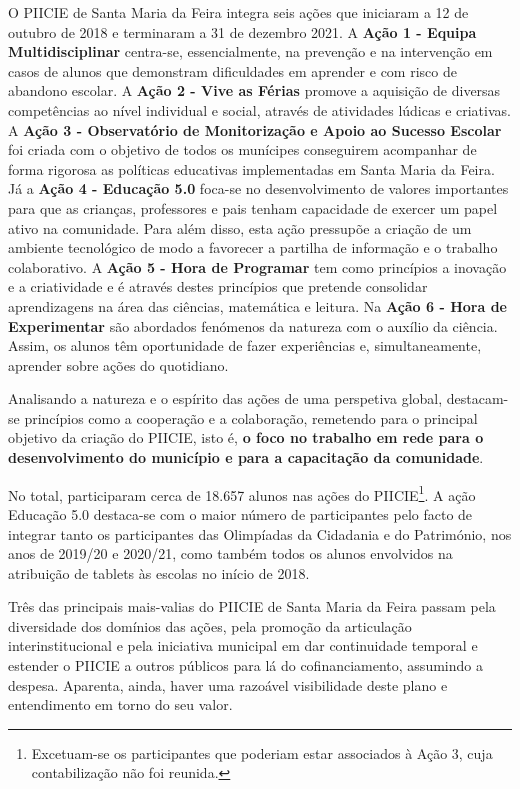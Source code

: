 \documentclass[
]{book}
\begin{document}
O PIICIE de Santa Maria da Feira integra seis ações que iniciaram a 12 de outubro de 2018 e terminaram a 31 de dezembro 2021. A \textbf{Ação 1 - Equipa Multidisciplinar} centra-se, essencialmente, na prevenção e na intervenção em casos de alunos que demonstram dificuldades em aprender e com risco de abandono escolar. A \textbf{Ação 2 - Vive as Férias} promove a aquisição de diversas competências ao nível individual e social, através de atividades lúdicas e criativas. A \textbf{Ação 3 - Observatório de Monitorização e Apoio ao Sucesso Escolar} foi criada com o objetivo de todos os munícipes conseguirem acompanhar de forma rigorosa as políticas educativas implementadas em Santa Maria da Feira. Já a \textbf{Ação 4 - Educação 5.0} foca-se no desenvolvimento de valores importantes para que as crianças, professores e pais tenham capacidade de exercer um papel ativo na comunidade. Para além disso, esta ação pressupõe a criação de um ambiente tecnológico de modo a favorecer a partilha de informação e o trabalho colaborativo. A \textbf{Ação 5 - Hora de Programar} tem como princípios a inovação e a criatividade e é através destes princípios que pretende consolidar aprendizagens na área das ciências, matemática e leitura. Na \textbf{Ação 6 - Hora de Experimentar} são abordados fenómenos da natureza com o auxílio da ciência. Assim, os alunos têm oportunidade de fazer experiências e, simultaneamente, aprender sobre ações do quotidiano.

Analisando a natureza e o espírito das ações de uma perspetiva global, destacam-se princípios como a cooperação e a colaboração, remetendo para o principal objetivo da criação do PIICIE, isto é, \textbf{o foco no trabalho em rede para o desenvolvimento do município e para a capacitação da comunidade}.

No total, participaram cerca de 18.657 alunos nas ações do PIICIE\footnote{Excetuam-se os participantes que poderiam estar associados à Ação 3, cuja contabilização não foi reunida.}. A ação Educação 5.0 destaca-se com o maior número de participantes pelo facto de integrar tanto os participantes das Olimpíadas da Cidadania e do Património, nos anos de 2019/20 e 2020/21, como também todos os alunos envolvidos na atribuição de tablets às escolas no início de 2018.

Três das principais mais-valias do PIICIE de Santa Maria da Feira passam pela diversidade dos domínios das ações, pela promoção da articulação interinstitucional e pela iniciativa municipal em dar continuidade temporal e estender o PIICIE a outros públicos para lá do cofinanciamento, assumindo a despesa. Aparenta, ainda, haver uma razoável visibilidade deste plano e entendimento em torno do seu valor.
\end{document}
